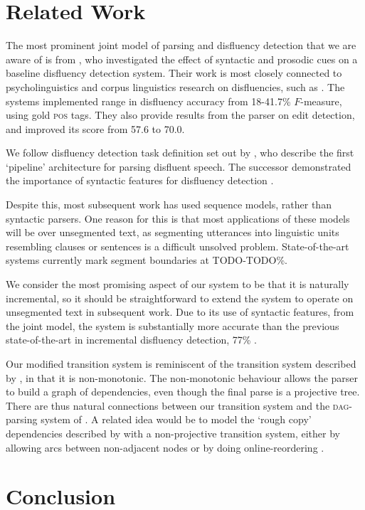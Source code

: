 \documentclass[11pt,letterpaper]{article}
\begin{document}
\section{Related Work}

The most prominent joint model of parsing and disfluency detection that we are
aware of is from \citet{hale:06}, who investigated the effect of syntactic and
prosodic cues on a baseline disfluency detection system.  Their work is most
closely connected to psycholinguistics and corpus linguistics research on
disfluencies, such as \citet{shriberg:98}. The systems \citeauthor{hale:06}
implemented range in disfluency accuracy from
18-41.7\% $F$-measure, using gold \textsc{pos} tags. They also provide results
from the  \citet{Charniak01a} parser on edit detection, and improved its score
from 57.6 to 70.0.

We follow disfluency detection task definition set out by 
\citet{Charniak01b}, who describe the first `pipeline' architecture for parsing
disfluent speech.  The successor
demonstrated the importance of syntactic features for disfluency detection
\citep{Johnson04a}.

Despite this, most subsequent work has used sequence models, rather than syntactic
parsers.  One reason for this is that most applications of these models will be
over unsegmented text, as segmenting utterances into linguistic units resembling
clauses or sentences is a difficult unsolved problem.  State-of-the-art systems
currently mark segment boundaries at TODO-TODO\%.

We consider the most promising aspect of our system to be that it is naturally
incremental, so it should be straightforward to extend the system to operate
on unsegmented text in subsequent work.  Due to its use of syntactic features,
from the joint model, the system is substantially more accurate than the previous
state-of-the-art in incremental disfluency detection, 77\% \citep{zwarts:10}.

Our modified transition system is reminiscent
of the transition system described by \citet{honnibal:13}, in that it is
non-monotonic.  The non-monotonic behaviour allows the parser to build a graph of dependencies,
even though the final parse is a projective tree. There are thus natural connections
between our transition system and the \textsc{dag}-parsing system of \citet{sagae:08}.
A related idea would be to model the `rough copy' dependencies described by 
\citet{Johnson04a} with a non-projective transition system, either by allowing
arcs between non-adjacent nodes \citep{cohen:11} or by doing online-reordering
\citep{nivre:09}.

\section{Conclusion}




\end{document}
